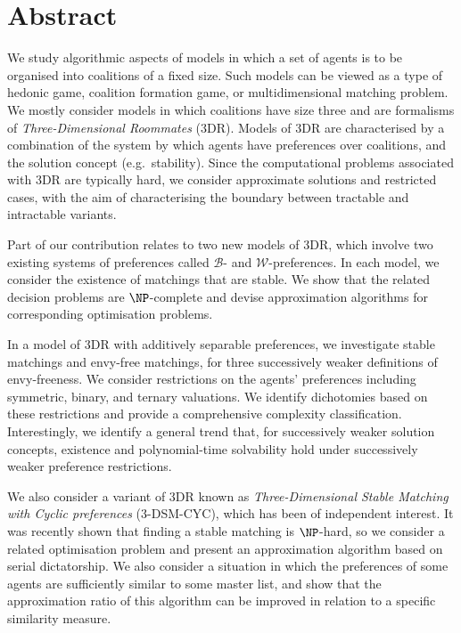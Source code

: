 \chapter*{Abstract}

We study algorithmic aspects of models in which a set of agents is to be organised into coalitions of a fixed size. Such models can be viewed as a type of hedonic game, coalition formation game, or multidimensional matching problem. We mostly consider models in which coalitions have size three and are formalisms of \emph{Three-Dimensional Roommates} (3DR). Models of 3DR are characterised by a combination of the system by which agents have preferences over coalitions, and the solution concept (e.g.\ stability). Since the computational problems associated with 3DR are typically hard, we consider approximate solutions and restricted cases, with the aim of characterising the boundary between tractable and intractable variants.

Part of our contribution relates to two new models of 3DR, which involve two existing systems of preferences called $\mathscr{B}$- and $\mathscr{W}$-preferences. In each model, we consider the existence of matchings that are stable. We show that the related decision problems are $\NP$\nobreakdash-complete and devise approximation algorithms for corresponding optimisation problems. 

In a model of 3DR with additively separable preferences, we investigate stable matchings and envy-free matchings, for three successively weaker definitions of envy-freeness. We consider restrictions on the agents' preferences including symmetric, binary, and ternary valuations. We identify dichotomies based on these restrictions and provide a comprehensive complexity classification. Interestingly, we identify a general trend that, for successively weaker solution concepts, existence and polynomial-time solvability hold under successively weaker preference restrictions.

We also consider a variant of 3DR known as \emph{Three-Dimensional Stable Matching with Cyclic preferences} (3-DSM-CYC), which has been of independent interest. It was recently shown that finding a stable matching is $\NP$-hard, so we consider a related optimisation problem and present an approximation algorithm based on serial dictatorship. We also consider a situation in which the preferences of some agents are sufficiently similar to some master list, and show that the approximation ratio of this algorithm can be improved in relation to a specific similarity measure.

